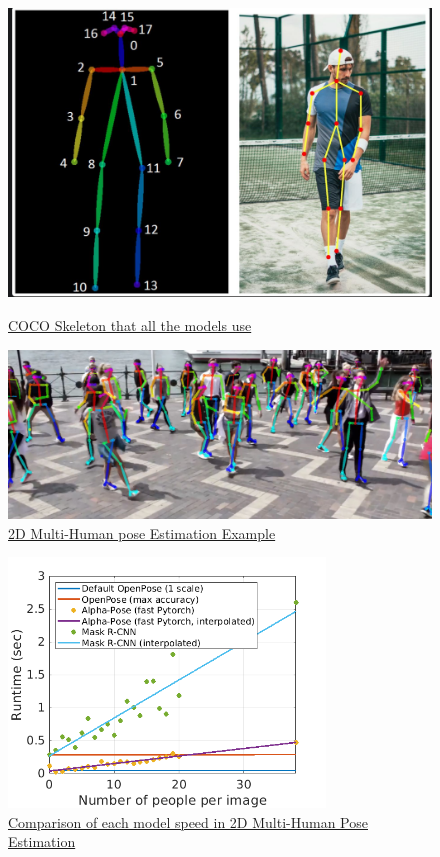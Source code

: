 \begin{figure}[htp]
	\centering
	\includegraphics[width=1\textwidth]{figures/Implementation/skeleton.png}
	\captionsetup{labelformat=empty}
    \caption{\href{https://i.stack.imgur.com/sdwNy.jpg}
	{COCO Skeleton that all the models use}}
	\hspace{1em}%
	\includegraphics[width=1\textwidth]{figures/Implementation/MultiPerson.png}
	\captionsetup{labelformat=empty}
	\caption{\href{https://github.com/CMU-Perceptual-Computing-Lab/openpose}
	{2D Multi-Human pose Estimation Example}}
\end{figure}

\pagebreak

 \begin{figure}[h]
	\centering
	\includegraphics[width=0.75\textwidth]{figures/Implementation/openpose_vs_competition.png}
	\captionsetup{labelformat=empty}
	\caption{\href{https://raw.githubusercontent.com/CMU-Perceptual-Computing-Lab/openpose/master/.github/media/openpose_vs_competition.png}
	{Comparison of each model speed in 2D Multi-Human Pose Estimation}}
\end{figure}

